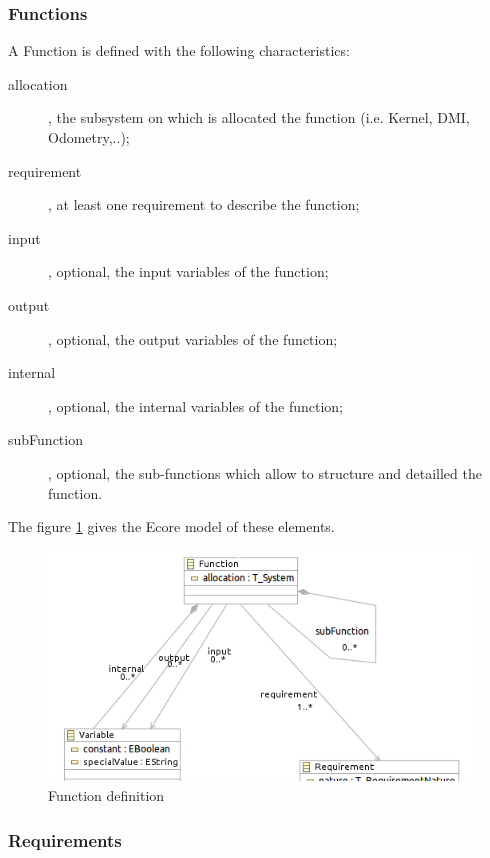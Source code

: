 \subsubsection{Functions}

A Function is defined with the following characteristics:
\begin{description}
\item[allocation], the subsystem  on which is allocated the function (i.e. Kernel, DMI, Odometry,..);
\item[requirement], at least one requirement to describe the function;
\item[input], optional, the input variables of the function;
\item[output], optional, the output variables of the function;
\item[internal], optional, the internal variables of the function;
\item[subFunction], optional, the sub-functions which allow to structure and  detailled the function.
\end{description}

The figure \ref{fig:function} gives the Ecore model of these elements.

\begin{figure}[ht]
  \centering
  \includegraphics{DataModel/Function1.png}
  \caption{Function definition}
  \label{fig:function}
\end{figure}

\subsubsection{Requirements}
\label{sec:req}

